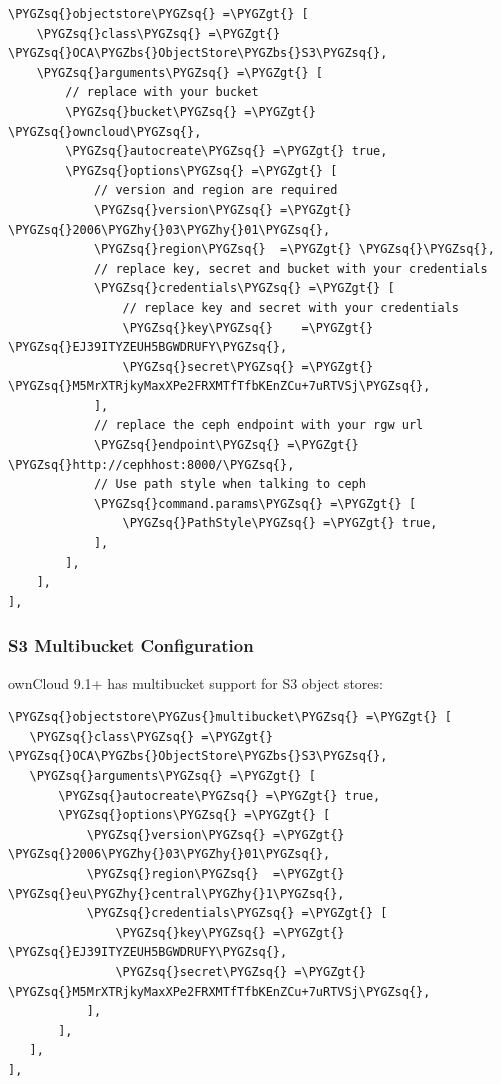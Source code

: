 \documentclass[letterpaper,10pt,english]{sphinxmanual}
\def\PYGZbs{\char`\\}
\def\PYGZus{\char`\_}
\def\PYGZgt{\char`\>}
\def\PYGZhy{\char`\-}
\def\PYGZsq{\char`\'}
\renewcommand\PYGZsq{\textquotesingle}
\begin{document}
\begin{Verbatim}[commandchars=\\\{\}]
\PYGZsq{}objectstore\PYGZsq{} =\PYGZgt{} [
    \PYGZsq{}class\PYGZsq{} =\PYGZgt{} \PYGZsq{}OCA\PYGZbs{}ObjectStore\PYGZbs{}S3\PYGZsq{},
    \PYGZsq{}arguments\PYGZsq{} =\PYGZgt{} [
        // replace with your bucket
        \PYGZsq{}bucket\PYGZsq{} =\PYGZgt{} \PYGZsq{}owncloud\PYGZsq{},
        \PYGZsq{}autocreate\PYGZsq{} =\PYGZgt{} true,
        \PYGZsq{}options\PYGZsq{} =\PYGZgt{} [
            // version and region are required
            \PYGZsq{}version\PYGZsq{} =\PYGZgt{} \PYGZsq{}2006\PYGZhy{}03\PYGZhy{}01\PYGZsq{},
            \PYGZsq{}region\PYGZsq{}  =\PYGZgt{} \PYGZsq{}\PYGZsq{},
            // replace key, secret and bucket with your credentials
            \PYGZsq{}credentials\PYGZsq{} =\PYGZgt{} [
                // replace key and secret with your credentials
                \PYGZsq{}key\PYGZsq{}    =\PYGZgt{} \PYGZsq{}EJ39ITYZEUH5BGWDRUFY\PYGZsq{},
                \PYGZsq{}secret\PYGZsq{} =\PYGZgt{} \PYGZsq{}M5MrXTRjkyMaxXPe2FRXMTfTfbKEnZCu+7uRTVSj\PYGZsq{},
            ],
            // replace the ceph endpoint with your rgw url
            \PYGZsq{}endpoint\PYGZsq{} =\PYGZgt{} \PYGZsq{}http://cephhost:8000/\PYGZsq{},
            // Use path style when talking to ceph
            \PYGZsq{}command.params\PYGZsq{} =\PYGZgt{} [
                \PYGZsq{}PathStyle\PYGZsq{} =\PYGZgt{} true,
            ],
        ],
    ],
],
\end{Verbatim}


\subsubsection{S3 Multibucket Configuration}
\label{enterprise_external_storage/s3_swift_as_primary_object_store_configuration:s3-multibucket-configuration}
ownCloud 9.1+ has multibucket support for S3 object stores:

\begin{Verbatim}[commandchars=\\\{\}]
\PYGZsq{}objectstore\PYGZus{}multibucket\PYGZsq{} =\PYGZgt{} [
   \PYGZsq{}class\PYGZsq{} =\PYGZgt{} \PYGZsq{}OCA\PYGZbs{}ObjectStore\PYGZbs{}S3\PYGZsq{},
   \PYGZsq{}arguments\PYGZsq{} =\PYGZgt{} [
       \PYGZsq{}autocreate\PYGZsq{} =\PYGZgt{} true,
       \PYGZsq{}options\PYGZsq{} =\PYGZgt{} [
           \PYGZsq{}version\PYGZsq{} =\PYGZgt{} \PYGZsq{}2006\PYGZhy{}03\PYGZhy{}01\PYGZsq{},
           \PYGZsq{}region\PYGZsq{}  =\PYGZgt{} \PYGZsq{}eu\PYGZhy{}central\PYGZhy{}1\PYGZsq{},
           \PYGZsq{}credentials\PYGZsq{} =\PYGZgt{} [
               \PYGZsq{}key\PYGZsq{} =\PYGZgt{} \PYGZsq{}EJ39ITYZEUH5BGWDRUFY\PYGZsq{},
               \PYGZsq{}secret\PYGZsq{} =\PYGZgt{} \PYGZsq{}M5MrXTRjkyMaxXPe2FRXMTfTfbKEnZCu+7uRTVSj\PYGZsq{},
           ],
       ],
   ],
],
\end{Verbatim}
\end{document}
